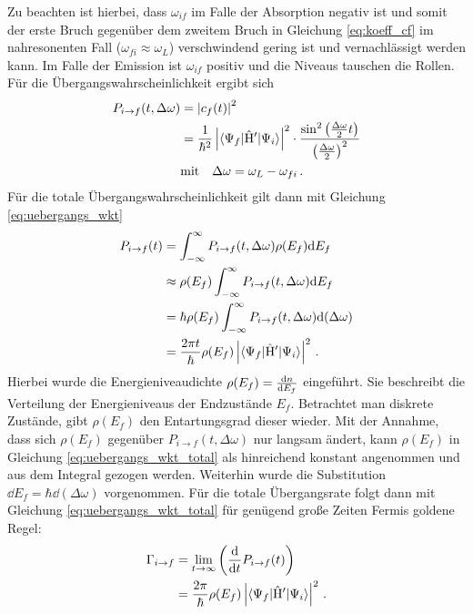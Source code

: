 Zu beachten ist hierbei, dass $\omega_{if}$ im Falle der Absorption negativ ist
und somit der erste Bruch gegenüber dem zweitem Bruch in
Gleichung \eqref{eq:koeff_cf} im nahresonenten Fall
($\omega_{fi}\approx\omega_L$) verschwindend gering ist und vernachlässigt werden kann. Im Falle der Emission ist $\omega_{if}$ positiv und die Niveaus tauschen
die Rollen.\\
Für die Übergangswahrscheinlichkeit ergibt sich
\begin{equation}\label{eq:uebergangs_wkt}
	\begin{split}
		P_{i\to f}(t,\Delta\omega) &= \left|c_f(t)\right|^2\\
		& =
		\frac{1}{\hbar^2}\left|\langle{\Psi_f}|\hat{\mathrm{H}}'|{\Psi_i}\rangle\right|^2\cdot\frac{\sin^2{\left(\frac{\Delta\omega}{2}t\right)}}{\left(\frac{\Delta\omega}{2}\right)^2}\\
		&\text{mit}\quad
		\Delta\omega=\omega_L-\omega_{fi}\,.
	\end{split}
\end{equation}
Für die totale Übergangswahrscheinlichkeit gilt dann mit Gleichung
\eqref{eq:uebergangs_wkt}
\begin{equation}\label{eq:uebergangs_wkt_total}
	\begin{split}
		P_{i\to f}(t)
		&= \int_{-\infty}^{\infty}{P_{i\to f}(t,\Delta\omega)\rho(E_f)}\mathrm{d} E_f\\
		&\approx \rho(E_f)\int_{-\infty}^{\infty}{P_{i\to f}(t,\Delta\omega)}\mathrm{d} E_f\\
		&= \hbar\rho(E_f)\int_{-\infty}^{\infty}{P_{i\to
		f}(t,\Delta\omega)}\mathrm{d}(\Delta\omega)\\
		&= \frac{2\pi t}{\hbar}\rho(E_f)\left|\langle{\Psi_f}|\hat{\mathrm{H}}'|{\Psi_i}\rangle\right|^2\,.
	\end{split}
\end{equation}
Hierbei wurde die Energieniveaudichte $\rho(E_f)=\frac{\mathrm{d} n}{\mathrm{d} E_f}$ eingeführt. Sie
beschreibt die Verteilung der Energieniveaus der Endzustände $E_f$. Betrachtet
man diskrete Zustände, gibt $\rho(E_f)$ den Entartungsgrad dieser wieder.  Mit
der Annahme, dass sich $\rho(E_f)$ gegenüber $P_{i\to f}(t,\Delta\omega)$ nur langsam ändert, kann $\rho(E_f)$ in Gleichung \eqref{eq:uebergangs_wkt_total}
als hinreichend konstant angenommen und aus dem Integral gezogen werden.
Weiterhin wurde die Substitution $\dd E_f=\hbar\dd(\Delta\omega)$ vorgenommen. Für die
totale Übergangsrate folgt dann mit Gleichung \eqref{eq:uebergangs_wkt_total}
für genügend große Zeiten Fermis goldene Regel:
\begin{equation}\label{eq:uebergangs_rate_total}
	\begin{split}
		\Gamma_{i\to f}
		&= \lim_{t\to\infty}{\left(\frac{\mathrm{d} }{\mathrm{d} t}{P_{i\to f}(t)}\right)}\\
		&= \frac{2\pi}{\hbar}\rho(E_f)\left|\langle{\Psi_f}|\hat{\mathrm{H}}'|{\Psi_i}\rangle\right|^2\,.
	\end{split}
\end{equation}

